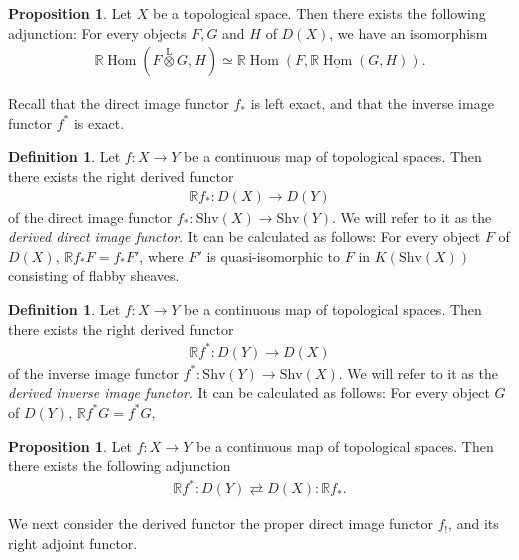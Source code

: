 \documentclass[a4paper,dvipdfmx,11pt,reqno]{amsart}
\DeclareMathOperator{\Hom}{Hom}
\newcommand{\bbR}{\mathbb{R}}
\newcommand{\otimesL}{\mathop{\otimes}\limits^{\mathrm{L}}}
\newcommand{\Shv}{\mathrm{Shv}}
\theoremstyle{definition}
\newtheorem{definition}[theorem]{Definition}
\newtheorem{proposition}[theorem]{Proposition}
\begin{document}
\begin{proposition} \label{Ike.2.2.6}
  Let $X$ be a topological space.
  Then there exists the following adjunction: 
  For every objects $F, G$ and $H$ of $D(X)$, we have an isomorphism 
  \begin{align*}
    \bbR \Hom(F \otimesL G, H) \simeq \bbR \Hom(F, \bbR \underline{\Hom}(G,H)).
  \end{align*}
\end{proposition}

Recall that the direct image functor $f_{*}$ is left exact, and that the inverse image functor $f^{*}$ is exact.

\begin{definition} \label{Ike.2.1.23} %
  Let $f : X \to Y$ be a continuous map of topological spaces.
  Then there exists the right derived functor 
  \begin{align*}
    \bbR f_{*} : D(X) \to D(Y)
  \end{align*}
  of the direct image functor $f_{*} : \Shv(X) \to \Shv(Y)$.
  We will refer to it as the \textit{derived direct image functor}.
  It can be calculated as follows:
  For every object $F$ of $D(X)$, $\bbR f_{*}F = f_{*}F'$, where $F'$ is quasi-isomorphic to $F$ in $K(\Shv(X))$ consisting of flabby sheaves.
\end{definition}

\begin{definition} \label{Ike.2.1.32}
  Let $f : X \to Y$ be a continuous map of topological spaces.
  Then there exists the right derived functor 
  \begin{align*}
    \bbR f^{*} : D(Y) \to D(X)
  \end{align*}
  of the inverse image functor $f^{*} : \Shv(Y) \to \Shv(X)$.
  We will refer to it as the \textit{derived inverse image functor}.
  It can be calculated as follows:
  For every object $G$ of $D(Y)$, $\bbR f^{*}G = f^{*}G$, 
\end{definition}

\begin{proposition}
  Let $f : X \to Y$ be a continuous map of topological spaces.
  Then there exists the following adjunction 
  \begin{align*}
    \bbR f^{\ast} : D(Y) \rightleftarrows D(X) : \bbR f_{\ast}.
  \end{align*}
\end{proposition}

We next consider the derived functor the proper direct image functor $f_{!}$, and its right adjoint functor.
\end{document}
